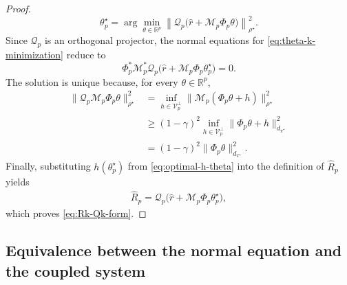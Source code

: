 \documentclass{article}
\theoremstyle{definition}
\theoremstyle{remark}
\theoremstyle{plain}
\newcommand{\dsieve}{p}
\numberwithin{equation}{section}
\begin{document}
\begin{proof}
\begin{equation}
\label{eq:theta-k-minimization}
    \theta_\dsieve^\star
    =
    \arg\min_{\theta\in\mathbb R^\dsieve}
    \left\|
        \mathcal Q_\dsieve
        \bigl(
            \widehat r+\mathcal M_\dsieve\Phi_\dsieve\theta
        \bigr)
    \right\|_{\rho^\star}^{2}.
\end{equation}
Since \(\mathcal Q_\dsieve\) is an orthogonal projector, the normal equations for
\eqref{eq:theta-k-minimization} reduce to
\begin{equation}
\label{eq:normal-equations-operator_app}
    \Phi_\dsieve^\ast\mathcal M_\dsieve^\ast\mathcal Q_\dsieve
    \bigl(
        \widehat r+\mathcal M_\dsieve\Phi_\dsieve\theta_\dsieve^\star
    \bigr)
    =0.
\end{equation}
The solution is unique because, for every \(\theta\in\mathbb R^\dsieve\),
\begin{align}
\label{eq:finite-normal-coercivity}
    \|\mathcal Q_\dsieve\mathcal M_\dsieve\Phi_\dsieve\theta\|_{\rho^\star}^{2}
    &=
    \inf_{h\in\mathcal V_\dsieve^\perp}
    \|\mathcal M_\dsieve(\Phi_\dsieve\theta+h)\|_{\rho^\star}^{2}
    \\
    &\geq
    (1-\gamma)^2
    \inf_{h\in\mathcal V_\dsieve^\perp}
    \|\Phi_\dsieve\theta+h\|_{d_{\pi^{\star}}}^{2}
    \\
    &=
    (1-\gamma)^2
    \|\Phi_\dsieve\theta\|_{d_{\pi^{\star}}}^{2}.
\end{align}
Finally, substituting \(h(\theta_\dsieve^\star)\) from
\eqref{eq:optimal-h-theta} into the definition of \(\widehat R_\dsieve\) yields
\begin{align*}
    \widehat R_\dsieve
   =
    \mathcal Q_\dsieve
    \bigl(
        \widehat r+\mathcal M_\dsieve\Phi_\dsieve\theta_\dsieve^\star
    \bigr),
\end{align*}
which proves \eqref{eq:Rk-Qk-form}.
\end{proof}




\subsection{Equivalence between the normal equation and the coupled system}
\label{app:coupled-system-equivalence}
\end{document}
